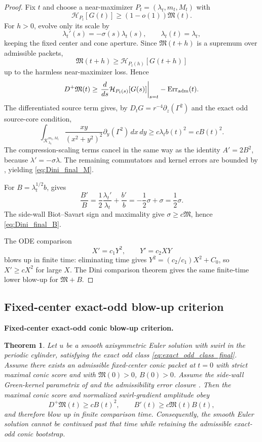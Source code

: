\documentclass[11pt]{amsart}
\newtheorem{theorem}{Theorem}[section]
\begin{document}
\begin{proof}
Fix \(t\) and choose a near-maximizer \(P_t=(\lambda_t,m_t,M_t)\) with
\[
\mathcal H_{P_t}[G(t)]\ge (1-o(1))\mathfrak M(t).
\]
For \(h>0\), evolve only its scale by
\[
\lambda_t'(s)=-\sigma(s)\lambda_t(s),
\qquad
\lambda_t(t)=\lambda_t,
\]
keeping the fixed center and cone aperture.  Since \(\mathfrak M(t+h)\) is a supremum over admissible packets,
\[
\mathfrak M(t+h)\ge \mathcal H_{P_t(h)}[G(t+h)]
\]
up to the harmless near-maximizer loss.  Hence
\[
D^+\mathfrak M(t)
\ge
\left.\frac d{ds}\mathcal H_{P_t(s)}[G(s)]\right|_{s=t}
-
\operatorname{Err}_{\rm adm}(t).
\]
The differentiated source term gives, by \(D_tG=r^{-4}\partial_z(\Gamma^2)\) and the exact odd source-core condition,
\[
\int_{\mathcal K_{\lambda_t}^{m_t,M_t}}
\frac{xy}{(x^2+y^2)^2}\partial_y(\Gamma^2)\,dx\,dy
\ge c\lambda_t b(t)^2=cB(t)^2.
\]
The compression-scaling terms cancel in the same way as the identity \(A'=2B^2\), because \(\lambda'=-\sigma\lambda\).  The remaining commutators and kernel errors are bounded by , yielding \eqref{eq:Dini_final_M}.

For \(B=\lambda_t^{1/2}b\),  gives
\[
\frac{B'}{B}=\frac12\frac{\lambda_t'}{\lambda_t}+\frac{b'}b
=-\frac12\sigma+\sigma=\frac12\sigma.
\]
The side-wall Biot--Savart sign and maximality give \(\sigma\ge c\mathfrak M\), hence \eqref{eq:Dini_final_B}.

The ODE comparison
\[
X'=c_1Y^2,
\qquad
Y'=c_2XY
\]
blows up in finite time: eliminating time gives \(Y^2=(c_2/c_1)X^2+C_0\), so \(X'\ge cX^2\) for large \(X\).  The Dini comparison theorem gives the same finite-time lower blow-up for \(\mathfrak M+B\).
\end{proof}

\subsection{Fixed-center exact-odd blow-up criterion}

\medskip
\noindent\textbf{Fixed-center exact-odd conic blow-up criterion.}
\begin{theorem}\label{thm:fixed_center_exact_odd_criterion}
Let \(u\) be a smooth axisymmetric Euler solution with swirl in the periodic cylinder, satisfying the exact odd class \eqref{eq:exact_odd_class_final}.  Assume there exists an admissible fixed-center conic packet at \(t=0\) with strict maximal conic score and with \(\mathfrak M(0)>0\), \(B(0)>0\).  Assume the side-wall Green-kernel parametrix of  and the admissibility error closure .  Then the maximal conic score and normalized swirl-gradient amplitude obey
\[
D^+\mathfrak M(t)\ge cB(t)^2,
\qquad
B'(t)\ge c\mathfrak M(t)B(t),
\]
and therefore blow up in finite comparison time.  Consequently, the smooth Euler solution cannot be continued past that time while retaining the admissible exact-odd conic bootstrap.
\end{theorem}
\end{document}
